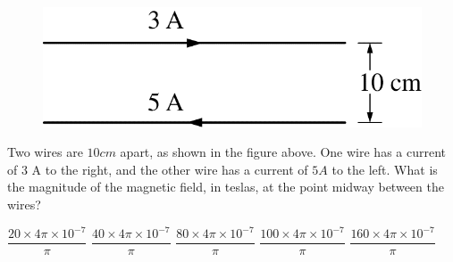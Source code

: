 \begin{figure}[H]
\centering
\includegraphics[scale=0.25]{images/img-009-030.png}
\end{figure}

\begin{questions}\setcounter{question}{17}\question
Two wires are $10 \unit{cm}$ apart, as shown in the figure above. One wire has a current of 3 A to the right, and the other wire has a current of $5 \unit{A}$ to the left. What is the magnitude of the magnetic field, in teslas, at the point midway between the wires?

\begin{choices}
\choice $\dfrac{20 \times 4 \pi \times 10^{-7}}{\pi}$
\choice $\dfrac{40 \times 4 \pi \times 10^{-7}}{\pi}$
\choice $\dfrac{80 \times 4 \pi \times 10^{-7}}{\pi}$
\choice $\dfrac{100 \times 4 \pi \times 10^{-7}}{\pi}$
\choice $\dfrac{160 \times 4 \pi \times 10^{-7}}{\pi}$
\end{choices}\end{questions}

